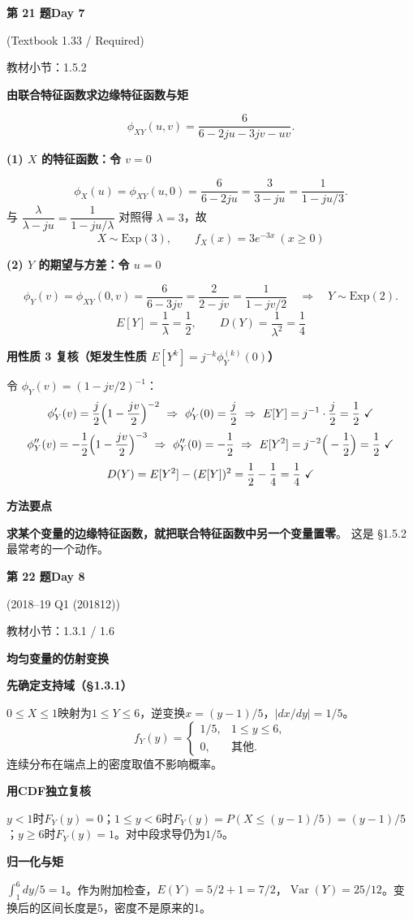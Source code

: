 \documentclass[10.5pt,fontset=fandol]{ctexart}
\newcommand{\key}[1]{\par\vspace{4pt}\noindent\textbf{\color{navy}#1}\par\vspace{2pt}}
\newcommand{\qtitle}[2]{\par\addvspace{1.2em}\Needspace{8\baselineskip}\begin{tcolorbox}[colback=navy,colframe=navy,arc=1.5pt,boxrule=0pt]\color{white}\large\bfseries #1\hfill\small #2\end{tcolorbox}}
\begin{document}
\qtitle{第 21 题}{Day 7}
{\small\color{accentred}(Textbook 1.33 / Required)}\par\smallskip
{\small\color{muted}教材小节：1.5.2}\par\medskip
\noindent\textbf{由联合特征函数求边缘特征函数与矩}\par\smallskip\begin{tcolorbox}[breakable,colback=qbg,colframe=qbg,boxrule=0pt]\[
\phi_{XY}(u,v)=\frac{6}{6-2ju-3jv-uv}.
\]

\key{(1) $X$ 的特征函数：令 $v=0$}
\[
\phi_X(u)=\phi_{XY}(u,0)=\frac{6}{6-2ju}=\frac{3}{3-ju}=\frac{1}{1-ju/3}.
\]
与 $\dfrac{\lambda}{\lambda-ju}=\dfrac{1}{1-ju/\lambda}$ 对照得 $\lambda=3$，故
\[
\boxed{X\sim\mathrm{Exp}(3),\qquad f_X(x)=3e^{-3x}\ (x\ge0)}
\]

\key{(2) $Y$ 的期望与方差：令 $u=0$}
\[
\phi_Y(v)=\phi_{XY}(0,v)=\frac{6}{6-3jv}=\frac{2}{2-jv}=\frac{1}{1-jv/2}
\quad\Longrightarrow\quad Y\sim\mathrm{Exp}(2).
\]
\[
\boxed{E[Y]=\frac{1}{\lambda}=\frac12,\qquad D(Y)=\frac{1}{\lambda^2}=\frac14}
\]

\key{用性质 3 复核（矩发生性质 $E[Y^k]=j^{-k}\phi_Y^{(k)}(0)$）}
令 $\phi_Y(v)=(1-jv/2)^{-1}$：
\[
\phi_Y'(v)=\frac{j}{2}\Big(1-\frac{jv}{2}\Big)^{-2}
\ \Rightarrow\ \phi_Y'(0)=\frac j2
\ \Rightarrow\ E[Y]=j^{-1}\cdot\frac j2=\frac12\ \text{\checkmark}
\]
\[
\phi_Y''(v)=-\frac12\Big(1-\frac{jv}{2}\Big)^{-3}
\ \Rightarrow\ \phi_Y''(0)=-\frac12
\ \Rightarrow\ E[Y^2]=j^{-2}\Big(-\frac12\Big)=\frac12\ \text{\checkmark}
\]
\[
D(Y)=E[Y^2]-(E[Y])^2=\frac12-\frac14=\frac14\ \text{\checkmark}
\]

\key{方法要点}
\textbf{求某个变量的边缘特征函数，就把联合特征函数中另一个变量置零}。
这是 §1.5.2 最常考的一个动作。
\end{tcolorbox}
\qtitle{第 22 题}{Day 8}
{\small\color{accentred}(2018--19 Q1 (201812))}\par\smallskip
{\small\color{muted}教材小节：1.3.1 / 1.6}\par\medskip
\noindent\textbf{均匀变量的仿射变换}\par\smallskip\begin{tcolorbox}[breakable,colback=qbg,colframe=qbg,boxrule=0pt]\key{先确定支持域（§1.3.1）}
$0\le X\le1$映射为$1\le Y\le6$，逆变换$x=(y-1)/5$，$|dx/dy|=1/5$。
\[\boxed{f_Y(y)=\begin{cases}1/5,&1\le y\le6,\\0,&\text{其他}.\end{cases}}\]
连续分布在端点上的密度取值不影响概率。
\key{用CDF独立复核}
$y<1$时$F_Y(y)=0$；$1\le y<6$时$F_Y(y)=P(X\le(y-1)/5)=(y-1)/5$；$y\ge6$时$F_Y(y)=1$。对中段求导仍为$1/5$。
\key{归一化与矩}
$\int_1^6dy/5=1$。作为附加检查，$E(Y)=5/2+1=7/2$，$\operatorname{Var}(Y)=25/12$。变换后的区间长度是5，密度不是原来的1。
\end{tcolorbox}
\end{document}
